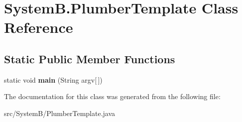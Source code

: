 \hypertarget{class_system_b_1_1_plumber_template}{}\section{System\+B.\+Plumber\+Template Class Reference}
\label{class_system_b_1_1_plumber_template}
\subsection*{Static Public Member Functions}
\begin{DoxyCompactItemize}
\item 
\hypertarget{class_system_b_1_1_plumber_template_aab68b5b7e46f1b274be715f6c8776703}{}static void {\bfseries main} (String argv\mbox{[}$\,$\mbox{]})\label{class_system_b_1_1_plumber_template_aab68b5b7e46f1b274be715f6c8776703}

\end{DoxyCompactItemize}


The documentation for this class was generated from the following file\+:\begin{DoxyCompactItemize}
\item 
src/\+System\+B/Plumber\+Template.\+java\end{DoxyCompactItemize}
